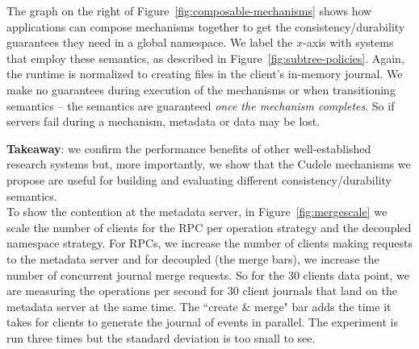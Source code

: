 
The graph on the right of Figure~\ref{fig:composable-mechanisms} shows how
applications can compose mechanisms together to get the consistency/durability
guarantees they need in a global namespace.  We label the \(x\)-axis with
systems that employ these semantics, as described in
Figure~\ref{fig:subtree-policies}.  Again, the runtime is normalized to
creating files in the client's in-memory journal.  We make no guarantees
during execution of the mechanisms or when transitioning semantics -- the
semantics are guaranteed {\it once the mechanism completes}. So if servers fail
during a mechanism, metadata or data may be lost.

\textbf{Takeaway}: we confirm the performance benefits of other
well-established research systems but, more importantly, we show that the
Cudele mechanisms we propose are useful for building and evaluating different
consistency/durability semantics.\\

To show the contention at the metadata server, in Figure~\ref{fig:mergescale}
we scale the number of clients for the RPC per operation strategy and the
decoupled namespace strategy. For RPCs, we increase the number of clients
making requests to the metadata server and for decoupled (the merge bars), we
increase the number of concurrent journal merge requests. So for the 30 clients
data point, we are measuring the operations per second for 30 client journals
that land on the metadata server at the same time. The ``create \& merge" bar
adds the time it takes for clients to generate the journal of events in
parallel. The experiment is run three times but the standard deviation is too
small to see.


